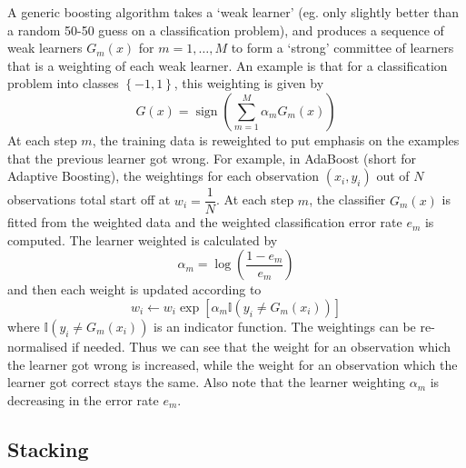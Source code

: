 \documentclass[11pt]{report} %
\begin{document}
A generic boosting algorithm takes a `weak learner' (eg. only slightly better than a random 50-50 guess on a classification problem), and produces a sequence of weak learners $G_{m}\left(x\right)$ for $m = 1, \dots, M$ to form a `strong' committee of learners that is a weighting of each weak learner. An example is that for a classification problem into classes $\left\{-1, 1\right\}$, this weighting is given by
\begin{equation}
G\left(x\right) = \operatorname{sign}\left(\sum_{m = 1}^{M}\alpha_{m}G_{m}\left(x\right)\right)
\end{equation}
At each step $m$, the training data is reweighted to put emphasis on the examples that the previous learner got wrong. For example, in AdaBoost \cite{Hastie2009, Zhou2012} (short for Adaptive Boosting), the weightings for each observation $\left(x_{i}, y_{i}\right)$ out of $N$ observations total start off at $w_{i} = \dfrac{1}{N}$. At each step $m$, the classifier $G_{m}\left(x\right)$ is fitted from the weighted data and the weighted classification error rate $e_{m}$ is computed. The learner weighted is calculated by
\begin{equation}
\alpha_{m} = \log\left(\dfrac{1 - e_{m}}{e_{m}}\right)
\end{equation}
and then each weight is updated according to
\begin{equation}
w_{i} \gets w_{i}\exp\left[\alpha_{m}\mathbb{I}\left(y_{i} \neq G_{m}\left(x_{i}\right)\right)\right]
\end{equation}
where $\mathbb{I}\left(y_{i} \neq G_{m}\left(x_{i}\right)\right)$ is an indicator function. The weightings can be re-normalised if needed. Thus we can see that the weight for an observation which the learner got wrong is increased, while the weight for an observation which the learner got correct stays the same. Also note that the learner weighting $\alpha_{m}$ is decreasing in the error rate $e_{m}$.

\subsection{Stacking}
\end{document}
